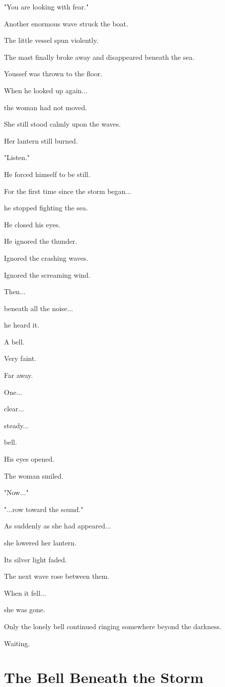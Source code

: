 \documentclass[12pt,openany]{book}
\begin{document}
"You are looking with fear."

Another enormous wave struck the boat.

The little vessel spun violently.

The mast finally broke away and disappeared beneath the sea.

Youssef was thrown to the floor.

When he looked up again...

the woman had not moved.

She still stood calmly upon the waves.

Her lantern still burned.

"Listen."

He forced himself to be still.

For the first time since the storm began...

he stopped fighting the sea.

He closed his eyes.

He ignored the thunder.

Ignored the crashing waves.

Ignored the screaming wind.

Then...

beneath all the noise...

he heard it.

A bell.

Very faint.

Far away.

One...

clear...

steady...

bell.

His eyes opened.

The woman smiled.

"Now..."

"...row toward the sound."

As suddenly as she had appeared...

she lowered her lantern.

Its silver light faded.

The next wave rose between them.

When it fell...

she was gone.

Only the lonely bell continued ringing somewhere beyond the darkness.

Waiting.
\section*{The Bell Beneath the Storm}
\end{document}
